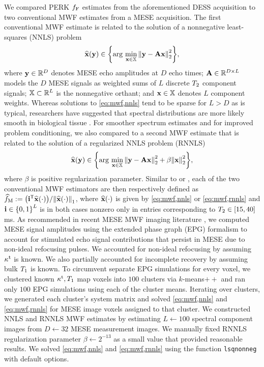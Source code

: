 We compared PERK $f_{\mathrm{F}}$ estimates
from the aforementioned DESS acquisition
to two conventional MWF estimates
from a MESE acquisition.
The first conventional MWF estimate \cite{mackay:94:ivv}
is related to the solution
of a nonnegative least-squares (NNLS) problem \cite{lawson:74}
\begin{align}
	\esta{\bmx}{\bmy} \in \set{\argmin{\bmx \in \setX} \norm{\bmy - \bmA \bmx}_2^2},
	\label{eq:mwf,nnls}
\end{align}
where $\mathbf{y} \in \mathbb{R}^{D}$ denotes 
MESE echo amplitudes at $D$ echo times;
$\mathbf{A} \in \mathbb{R}^{D \times L}$ models the $D$ MESE signals
as weighted sums of $L$ discrete $T_2$ component signals;
$\mathbb{X} \subset \mathbb{R}^{L}$ is the nonnegative orthant;
and
$\mathbf{x} \in \mathbb{X}$ denotes $L$ component weights.
Whereas solutions to \eqref{eq:mwf,nnls} tend to be sparse
for $L>D$ as is typical,
researchers have suggested
that spectral distributions are more likely smooth
in biological tissue \cite{kroeker:86:aob}.
For smoother \invivo spectrum estimates 
and for improved problem conditioning,
we also compared 
to a second MWF estimate \cite{whittall:89:qio}
that is related to the solution
of a regularized NNLS problem (RNNLS)
\begin{align}
	\esta{\bmx}{\bmy} \in \set{\argmin{\bmx \in \setX} \norm{\bmy - \bmA \bmx}_2^2
		+ \beta \norm{\bmx}_2^2},
	\label{eq:mwf,rnnls}
\end{align}
where $\beta$ is positive regularization parameter.
Similar to \cite{mackay:94:ivv} or \cite{whittall:89:qio},
each of the two conventional MWF estimators 
are then respectively defined as 
$\mwfest := \paren{\bmi\tpose \esta{\bmx}{\cdot}}/\norm{\esta{\bmx}{\cdot}}_1$,
where $\esta{\bmx}{\cdot}$ is given
by \eqref{eq:mwf,nnls} or \eqref{eq:mwf,rnnls}
and $\bmi \in \set{0,1}^L$ is in both cases nonzero
only in entries corresponding to $\Tt \in \brac{15,40}$ms.
As recommended in recent MESE MWF imaging literature \cite{prasloski:12:aos},
we computed MESE signal amplitudes
using the extended phase graph (EPG) formalism \cite{hennig:88:mis}
to account for stimulated echo signal contributions
that persist in MESE due to non-ideal refocusing pulses.
We accounted for non-ideal refocusing
by assuming $\kappa^{\mathrm{t}}$ is known. 
We also partially accounted for incomplete recovery
by assuming bulk $T_1$ is known. 
To circumvent separate EPG simulations for every voxel,
we clustered known $\kappa^{\mathrm{t}},T_1$ map voxels
into $100$ clusters via $k$-means$++$ \cite{arthur:07:kmt}
and ran only $100$ EPG simulations 
using each of the cluster means.
Iterating over clusters,
we generated each cluster's system matrix 
and solved \eqref{eq:mwf,nnls} and \eqref{eq:mwf,rnnls} 
for MESE image voxels assigned to that cluster.
We constructed NNLS and RNNLS MWF estimates
by estimating $L \gets 100$ spectral component images
from $D \gets 32$ MESE measurement images.
We manually fixed RNNLS regularization parameter $\beta \gets 2^{-13}$
as a small value that provided reasonable \invivo results.
We solved \eqref{eq:mwf,nnls} and \eqref{eq:mwf,rnnls}
using the \matlab function \texttt{lsqnonneg} 
with default options.

